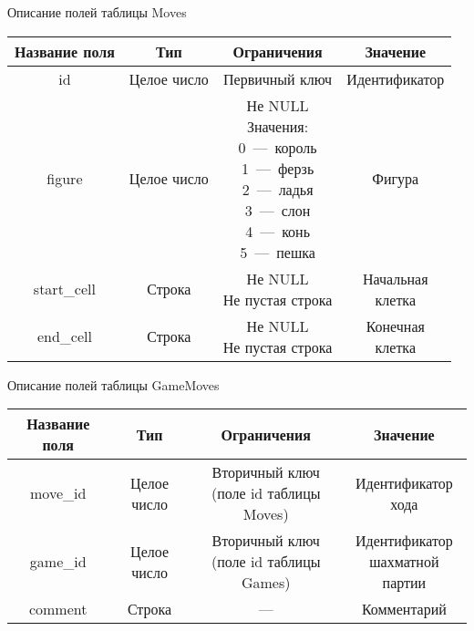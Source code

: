 \begin{center}
	\begin{threeparttable}
		\captionsetup{justification=raggedright,singlelinecheck=off}
		\caption{\label{moves_table}Описание полей таблицы Moves}
		\centering
		\begin{tabular}{|c|c|c|c|}
			\hline
			Название поля & Тип & Ограничения & Значение \\
			\hline
			id & Целое число & Первичный ключ & Идентификатор \\
			\hline
			figure & Целое число & \specialcell{Не NULL\\Значения:\\0~---~король\\1~---~ферзь\\2~---~ладья\\3~---~слон\\4~---~конь\\5~---~пешка} & Фигура\\
			\hline
			start\_cell & Строка & \specialcell{Не NULL\\Не пустая строка} & \specialcell{Начальная\\клетка} \\
			\hline
			end\_cell & Строка & \specialcell{Не NULL\\Не пустая строка} & \specialcell{Конечная\\клетка} \\
			\hline
		\end{tabular}
	\end{threeparttable}
\end{center}
\begin{center}
	\begin{threeparttable}
		\captionsetup{justification=raggedright,singlelinecheck=off}
		\caption{\label{gamemoves_table}Описание полей таблицы GameMoves}
		\centering
		\begin{tabular}{|c|c|c|c|}
			\hline
			Название поля & Тип & Ограничения & Значение \\
			\hline
			move\_id & Целое число & \specialcell{Вторичный ключ\\(поле id таблицы Moves)} & \specialcell{Идентификатор\\хода} \\
			\hline
			game\_id & Целое число & \specialcell{Вторичный ключ\\(поле id таблицы Games)} & \specialcell{Идентификатор\\шахматной партии} \\
			\hline
			comment & Строка & --- & Комментарий \\
			\hline
		\end{tabular}
	\end{threeparttable}
\end{center}


